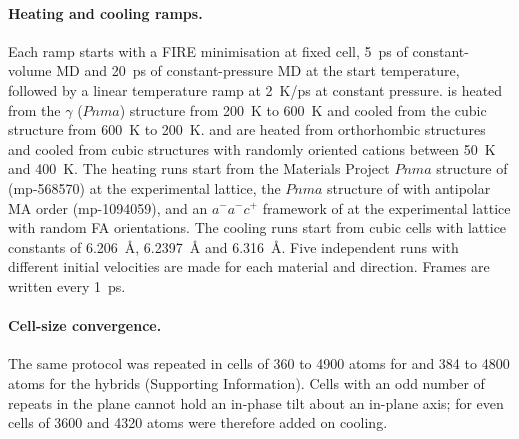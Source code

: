 \paragraph{Heating and cooling ramps.}
Each ramp starts with a FIRE minimisation at fixed cell, \SI{5}{ps} of
constant-volume MD and \SI{20}{ps} of constant-pressure MD at the start
temperature, followed by a linear temperature ramp at \SI{2}{K/ps} at constant
pressure. \CsSnI{} is heated from the $\gamma$ ($Pnma$) structure from
\SI{200}{K} to \SI{600}{K} and cooled from the cubic structure from
\SI{600}{K} to \SI{200}{K}. \MASnI{} and \FASnI{} are heated from orthorhombic
structures and cooled from cubic structures with randomly oriented cations
between \SI{50}{K} and \SI{400}{K}. The heating runs start from the Materials Project
$Pnma$ structure of \CsSnI{} (mp-568570) at the experimental lattice,\cite{Chung2012JACS} the
$Pnma$ structure of \MASnI{} with antipolar MA order (mp-1094059), and an $a^-a^-c^+$
framework of \FASnI{} at the experimental lattice\cite{schueller2018crystal} with random FA
orientations. The cooling runs start from cubic cells with lattice constants of
\SI{6.206}{\angstrom}, \SI{6.2397}{\angstrom} and \SI{6.316}{\angstrom}.\cite{Chung2012JACS, Mitzi1995JSSC, schueller2018crystal}
Five independent runs with different initial velocities
are made for each material and direction. Frames are written every
\SI{1}{ps}.

\paragraph{Cell-size convergence.}
The same protocol was repeated in cells of 360 to 4900 atoms for \CsSnI{} and
384 to 4800 atoms for the hybrids (Supporting Information). Cells with an odd
number of repeats in the plane cannot hold an in-phase tilt about an in-plane
axis; for \CsSnI{} even cells of 3600 and 4320 atoms were therefore added on
cooling.


